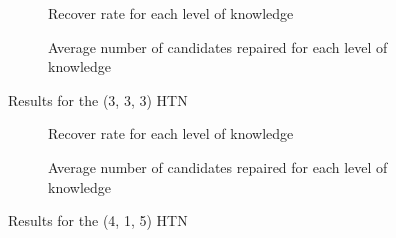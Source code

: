 \documentclass[conference]{IEEEtran}
\begin{document}
	
	\begin{figure}[t]
		\centering
		\begin{subfigure}[b]{0.5 \columnwidth}            
			\caption{ Recover rate for each level of knowledge}
			\label{Fig:Data3}
		\end{subfigure}
		\hspace{1cm}
		\begin{subfigure}[b]{0.5 \columnwidth}
			\centering
			\caption{Average number of candidates repaired for each level of knowledge}
			\label{Fig:Data4}
		\end{subfigure}
		\caption{Results for the (3, 3, 3) HTN}\label{fig:TOF}
	\end{figure}
	
	\begin{figure}[t]
		\centering
		\begin{subfigure}[b]{0.5 \columnwidth}            
			\caption{ Recover rate for each level of knowledge}
			\label{Fig:Data1}
		\end{subfigure}
		\hspace{1cm}
		\begin{subfigure}[b]{0.5 \columnwidth}
			\centering
			\caption{Average number of candidates repaired for each level of knowledge}
			\label{Fig:Data2}
		\end{subfigure}
		\caption{Results for the (4, 1, 5) HTN}\label{fig:TOF2}
	\end{figure}		 
	
\end{document}
